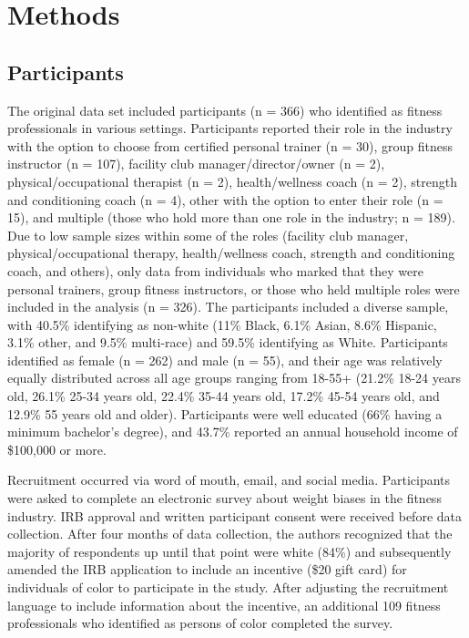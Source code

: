 \documentclass[
  jou,
  longtable,
  nolmodern,
  notxfonts,
  notimes,
  colorlinks=true,linkcolor=blue,citecolor=blue,urlcolor=blue]{apa7}
\begin{document}
\section{Methods}\label{methods}

\subsection{Participants}\label{participants}

The original data set included participants (n = 366) who identified as
fitness professionals in various settings. Participants reported their
role in the industry with the option to choose from certified personal
trainer (n = 30), group fitness instructor (n = 107), facility club
manager/director/owner (n = 2), physical/occupational therapist (n = 2),
health/wellness coach (n = 2), strength and conditioning coach (n = 4),
other with the option to enter their role (n = 15), and multiple (those
who hold more than one role in the industry; n = 189). Due to low sample
sizes within some of the roles (facility club manager,
physical/occupational therapy, health/wellness coach, strength and
conditioning coach, and others), only data from individuals who marked
that they were personal trainers, group fitness instructors, or those
who held multiple roles were included in the analysis (n = 326). The
participants included a diverse sample, with 40.5\% identifying as
non-white (11\% Black, 6.1\% Asian, 8.6\% Hispanic, 3.1\% other, and
9.5\% multi-race) and 59.5\% identifying as White. Participants
identified as female (n = 262) and male (n = 55), and their age was
relatively equally distributed across all age groups ranging from 18-55+
(21.2\% 18-24 years old, 26.1\% 25-34 years old, 22.4\% 35-44 years old,
17.2\% 45-54 years old, and 12.9\% 55 years old and older). Participants
were well educated (66\% having a minimum bachelor's degree), and 43.7\%
reported an annual household income of \$100,000 or more.

Recruitment occurred via word of mouth, email, and social media.
Participants were asked to complete an electronic survey about weight
biases in the fitness industry. IRB approval and written participant
consent were received before data collection. After four months of data
collection, the authors recognized that the majority of respondents up
until that point were white (84\%) and subsequently amended the IRB
application to include an incentive (\$20 gift card) for individuals of
color to participate in the study. After adjusting the recruitment
language to include information about the incentive, an additional 109
fitness professionals who identified as persons of color completed the
survey.
\end{document}
